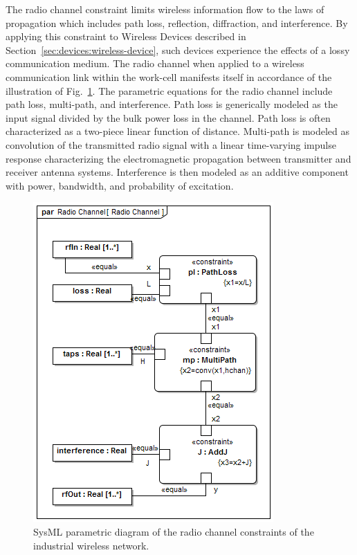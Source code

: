 \documentclass[journal, twoside]{IEEEtran}
\begin{document}
	The radio channel constraint limits wireless information flow to the laws of propagation which includes path loss, reflection, diffraction, and interference.  By applying this constraint to Wireless Devices described in Section~\ref{sec:devices:wireless-device}, such devices experience the effects of a lossy communication medium. The radio channel when applied to a wireless communication link within the work-cell manifests itself in accordance of the illustration of Fig.~\ref{fig:par:iwn-radio}.  The parametric equations for the radio channel include path loss, multi-path, and interference.  Path loss is generically modeled as the input signal divided by the bulk power loss in the channel. Path loss is often characterized as a two-piece linear function of distance\cite{Candell2017.NIST1951}. Multi-path is modeled as convolution of the transmitted radio signal with a linear time-varying impulse response characterizing the electromagnetic propagation between transmitter and receiver antenna systems.  Interference is then modeled as an additive component with power, bandwidth, and probability of excitation.
	
	\begin{figure}[tbp]
		\includegraphics[width=\columnwidth]{diagrams/par__Radio_Channel__Radio_Channel}%
		\caption{SysML parametric diagram of the radio channel constraints of the industrial wireless network.}%
		\label{fig:par:iwn-radio}
	\end{figure} 
	
\end{document}
